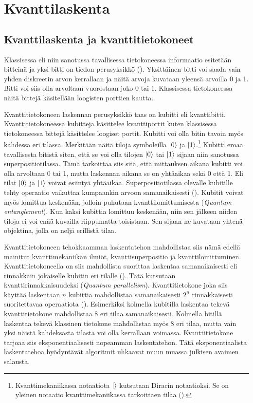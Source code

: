\chapter{Kvanttilaskenta}

\section{Kvanttilaskenta ja kvanttitietokoneet}
Klassisessa eli niin sanotussa tavallisessa tietokoneessa informaatio esitetään bitteinä ja yksi bitti on tiedon perusyksikkö (\cite{doi:10.1080/23742917.2016.1226650}). Yksittäinen bitti voi saada vain yhden diskreetin arvon kerrallaan ja näitä arvoja kuvataan yleensä arvoilla 0 ja 1. Bitti voi siis olla arvoltaan vuorostaan joko 0 tai 1. Klassisessa tietokoneessa näitä bittejä käsitellään loogisten porttien kautta.

Kvanttitietokoneen laskennan perusyksikkö taas on kubitti eli kvanttibitti. Kvanttitietokoneessa kubitteja käsittelee kvanttiportit kuten klassisessa tietokoneessa bittejä käsittelee loogiset portit. Kubitti voi olla bitin tavoin myös kahdessa eri tilassa. Merkitään näitä tiloja symboleilla
$\ket{0}$ ja $\ket{1}$.\footnote{Kvanttimekaniikassa notaatiota $\ket{}$ kutsutaan Diracin notaatioksi. Se on yleinen notaatio kvanttimekaniikassa tarkoittaen tilaa (\cite{nielsen2001quantum}).} Kubitti eroaa tavallisesta bitistä siten, että se voi olla tilojen $\ket{0}$ tai $\ket{1}$ sijaan niin sanotussa superpositiotilassa. Tämä tarkoittaa siis sitä, että mittauksen aikana kubitti voi olla arvoltaan 0 tai 1, mutta laskennan aikana se on yhtäaikaa sekä 0 että 1. Eli tilat $\ket{0}$ ja $\ket{1}$ voivat esiintyä yhtäaikaa. Superpositiotilassa olevalle kubitille tehty operaatio vaikuttaa kumpaankin arvoon samanaikaisesti (\cite{mavroeidis2018impact}). Kubitit voivat myös lomittua keskenään, jolloin puhutaan kvanttilomittumisesta (\emph{Quantum entanglement}). Kun kaksi kubittia lomittuu keskenään, niin sen jälkeen niiden tiloja ei voi enää kuvailla riippumatta toisistaan. Sen sijaan ne kuvataan yhtenä objektina, jolla on neljä erillistä tilaa.

Kvanttitietokoneen tehokkaamman laskentatehon mahdollistaa siis nämä edellä mainitut kvanttimekaniikan ilmiöt, kvanttisuperpositio ja kvanttilomittuminen. Kvanttitietokoneella on siis mahdollista suorittaa laskentaa samanaikaisesti eli rinnakkain jokaiselle kubitin eri tilalle (\cite{doi:10.1080/23742917.2016.1226650}). Tätä kutsutaan kvanttirinnakkaisuudeksi (\emph{Quantum parallelism}). Kvanttitietokone joka siis käyttää laskentaan $n$ kubittia mahdollistaa samanaikaisesti $2^{n}$ rinnakkaisesti suoritettavaa operaatiota (\cite{mavroeidis2018impact}). Esimerkiksi kolmella kubitilla laskentaa tekevä kvanttitietokone mahdollistaa 8 eri tilaa samanaikaisesti. Kolmella bitillä laskentaa tekevä klassinen tietokone mahdollistaa myös 8 eri tilaa, mutta vain yksi näistä kahdeksasta tilasta voi olla kerrallaan voimassa.  Kvanttitietokone tarjoaa siis eksponentiaalisesti nopeamman laskentatehon. Tätä eksponentiaalista laskentatehoa hyödyntävät algoritmit uhkaavat muun muassa julkisen avaimen salausta.

